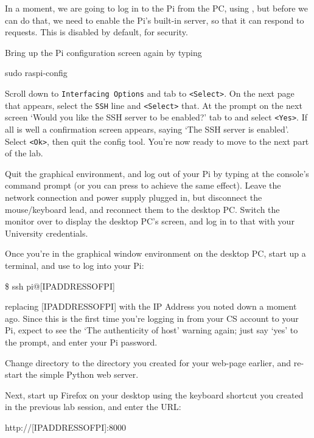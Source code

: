 In a moment, we are going to log in to the Pi from the PC, using
, but before we can do that, we need to enable the Pi's
built-in  server, so that it can respond to
 requests. This is disabled by default, for security.

Bring up the Pi configuration screen again by typing

\begin{ttoutenv}
sudo raspi-config
\end{ttoutenv}

Scroll down to \verb+Interfacing Options+ and tab to
\verb+<Select>+. On the next page that appears, select the \verb+SSH+
line and \verb+<Select>+ that. At the prompt on the next screen `Would
you like the SSH server to be enabled?' tab to and select
\verb+<Yes>+. If all is well a confirmation screen appears, saying
`The SSH server is enabled'. Select \verb+<Ok>+, then quit the config
tool. You're now ready to move to the next part of the lab.

Quit the graphical environment, and log out of your Pi by typing
 at the console's command prompt (or you can
press  to achieve the same effect). Leave the network
connection and power supply plugged in, but disconnect the
mouse/keyboard lead, and reconnect them to the desktop PC. Switch the
monitor over to display the desktop PC's screen, and log in to that
with your University credentials.

Once you're in the graphical window environment on the desktop PC,
start up a terminal, and use  to log into your Pi:

\begin{ttoutenv}
\$ ssh pi@[IPADDRESSOFPI]
\end{ttoutenv}

replacing [IPADDRESSOFPI] with the IP Address you noted down a moment
ago. Since this is the first time you're logging in from your CS
account to your Pi, expect to see the `The authenticity of host'
warning again; just say `yes' to the prompt, and enter your Pi
password.

Change directory to the  directory you created for
your web-page earlier, and re-start the simple Python web server.

Next, start up Firefox on your desktop using the keyboard shortcut you
created in the previous lab session, and enter the URL:

\begin{ttoutenv}
http://[IPADDRESSOFPI]:8000
\end{ttoutenv}

